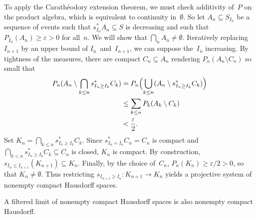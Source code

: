 To apply the Carathéodory extension theorem,
we must check \sig additivity of~$P$ on the product algebra,
which is equivalent to continuity in~$\emptyset$.
So let \( A_n \subseteq S_{I_n} \) be a sequence of events
such that \( s_{I_n}^* A_n \subseteq S \) is decreasing
and such that \( P_{I_n}(A_n) \ge \varepsilon > 0 \) for all~$n$.
We will show that \( \bigcap_n A_n \ne \emptyset \).
Iteratively replacing~$I_{n+1}$ by an upper bound of $I_n$~and~$I_{n+1}$,
we can suppose the~$I_n$ increasing.
By tightness of the measures, there are compact \( C_n \subseteq A_n \)
rendering \( P_n(A_n \setminus C_n) \) so small that
\begin	{align}
\label	{eq:kolmogorov-tight-compacts}
	P_n( A_n \setminus \bigcap_{k \le n} s_{I_n \ge I_k}^* C_k )
	&=	P_n\Bigl( \bigcup_{k \le n}
		(A_n \setminus s_{I_n \ge I_k}^* C_k) \Bigr) \\
	&\le	\sum_{k \le n} P_k( A_k \setminus C_k )      \\
	&<	\frac \varepsilon 2                          \text.
\end	{align}
Set \( K_n = \bigcap_{k \le n} s_{I_n \ge I_k}^* C_k \).
Since \( s_{I_n = I_n}^* C_n = C_n \) is compact
and \( \bigcap_{k < n} s_{I_n \ge I_k}^* C_k \subseteq C_n \) is closed,
$K_n$ is compact.
By construction, \( s_{I_n \le I_{n+1}}(K_{n+1}) \subseteq K_n \).
Finally, by the choice of~$C_n$, \( P_n(K_n) \ge \varepsilon/2 > 0 \),
so that \( K_n \ne \emptyset \).
Thus restricting \( s_{I_{n+1} \ge I_n} \colon K_{n+1} \to K_n \)
yields a projective system of nonempty compact Hausdorff spaces.

\begin	{lemma}
A filtered limit of nonempty compact Hausdorff spaces
is also nonempty compact Hausdorff.
\end	{lemma}
